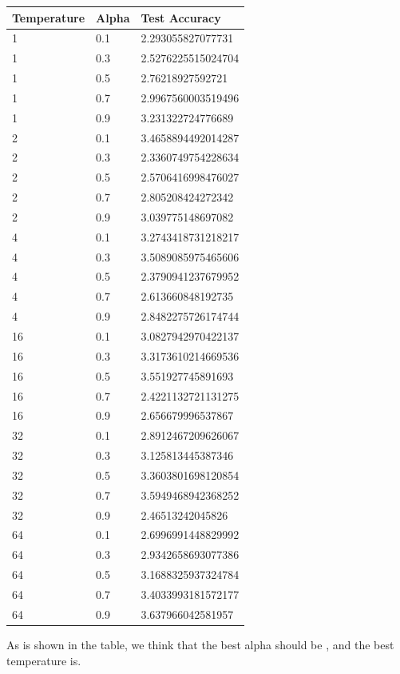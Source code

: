\documentclass[conference]{IEEEtran}
\begin{document}
\begin{table}[]
    \begin{tabular}{|l|l|l|}
    \hline
    Temperature & Alpha & Test Accuracy      \\ \hline
    1           & 0.1   & 2.293055827077731  \\ \hline
    1           & 0.3   & 2.5276225515024704 \\ \hline
    1           & 0.5   & 2.76218927592721   \\ \hline
    1           & 0.7   & 2.9967560003519496 \\ \hline
    1           & 0.9   & 3.231322724776689  \\ \hline
    2           & 0.1   & 3.4658894492014287 \\ \hline
    2           & 0.3   & 2.3360749754228634 \\ \hline
    2           & 0.5   & 2.5706416998476027 \\ \hline
    2           & 0.7   & 2.805208424272342  \\ \hline
    2           & 0.9   & 3.039775148697082  \\ \hline
    4           & 0.1   & 3.2743418731218217 \\ \hline
    4           & 0.3   & 3.5089085975465606 \\ \hline
    4           & 0.5   & 2.3790941237679952 \\ \hline
    4           & 0.7   & 2.613660848192735  \\ \hline
    4           & 0.9   & 2.8482275726174744 \\ \hline
    16          & 0.1   & 3.0827942970422137 \\ \hline
    16          & 0.3   & 3.3173610214669536 \\ \hline
    16          & 0.5   & 3.551927745891693  \\ \hline
    16          & 0.7   & 2.4221132721131275 \\ \hline
    16          & 0.9   & 2.656679996537867  \\ \hline
    32          & 0.1   & 2.8912467209626067 \\ \hline
    32          & 0.3   & 3.125813445387346  \\ \hline
    32          & 0.5   & 3.3603801698120854 \\ \hline
    32          & 0.7   & 3.5949468942368252 \\ \hline
    32          & 0.9   & 2.46513242045826   \\ \hline
    64          & 0.1   & 2.6996991448829992 \\ \hline
    64          & 0.3   & 2.9342658693077386 \\ \hline
    64          & 0.5   & 3.1688325937324784 \\ \hline
    64          & 0.7   & 3.4033993181572177 \\ \hline
    64          & 0.9   & 3.637966042581957  \\ \hline
    \end{tabular}
    \end{table}
As is shown in the table, we think that the best alpha should be , and the best temperature is.
\end{document}
